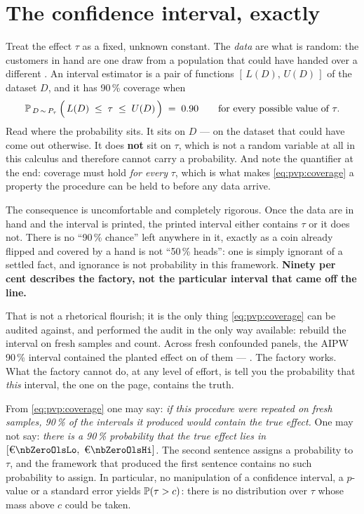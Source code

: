 \section{The confidence interval, exactly}
\label{sec:pvp:ci}

Treat the effect $\tau$ as a fixed, unknown constant. The \emph{data} are what is random: the
\nbZeroNCustomers{} customers in hand are one draw from a population that could have handed over
a different \nbZeroNCustomers. An interval estimator is a pair of functions
$[\,L(D),\, U(D)\,]$ of the dataset $D$, and it has 90\,\% coverage when
%
\begin{equation}
  \operatorname{\mathbb{P}}_{\,D \,\sim\, P_\tau}\Big(\,L(D) \;\le\; \tau \;\le\; U(D)\,\Big) \;=\; 0.90
  \qquad\text{for every possible value of } \tau .
  \label{eq:pvp:coverage}
\end{equation}
%
Read where the probability sits. It sits on $D$ --- on the dataset that could have come out
otherwise. It does \textbf{not} sit on $\tau$, which is not a random variable at all in this
calculus and therefore cannot carry a probability. And note the quantifier at the end: coverage
must hold \emph{for every} $\tau$, which is what makes \cref{eq:pvp:coverage} a property the
procedure can be held to before any data arrive.

The consequence is uncomfortable and completely rigorous. Once the data are in hand and the
interval is printed, the printed interval either contains $\tau$ or it does not. There is no
``90\,\% chance'' left anywhere in it, exactly as a coin already flipped and covered by a hand
is not ``50\,\% heads'': one is simply ignorant of a settled fact, and ignorance is not
probability in this framework. \textbf{Ninety per cent describes the factory, not the particular
interval that came off the line.}

That is not a rhetorical flourish; it is the only thing \cref{eq:pvp:coverage} can be audited
against, and  performed the audit in the only way available: rebuild the interval on
fresh samples and count. Across \nbZeroNSeeds{} fresh confounded panels, the AIPW 90\,\%
interval contained the planted effect on \nbZeroAipwCovered{} of them ---
\pc{\nbZeroAipwCovPct}. The factory works. What the factory cannot do, at any level of effort,
is tell you the probability that \emph{this} interval, the one on the page, contains the truth.

\begin{proposition}
\label{prop:pvp:ci}
From \cref{eq:pvp:coverage} one may say: \emph{if this procedure were repeated on fresh samples,
90\,\% of the intervals it produced would contain the true effect.} One may not say: \emph{there
is a 90\,\% probability that the true effect lies in $[\eur{\nbZeroOlsLo},\ \eur{\nbZeroOlsHi}]$.}
The second sentence assigns a probability to $\tau$, and the framework that produced the first
sentence contains no such probability to assign. In particular, no manipulation of a confidence
interval, a $p$-value or a standard error yields $\operatorname{\mathbb{P}}(\tau > c)$: there is no distribution over
$\tau$ whose mass above $c$ could be taken.
\end{proposition}

